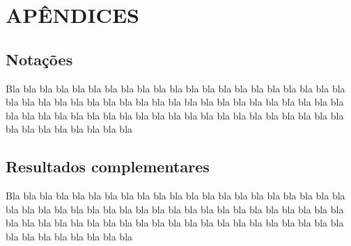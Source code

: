 \documentclass[
	article,			%
	12pt,				%
	oneside,			%
	a4paper,			%
	english,			%
	brazil,				%
	sumario=tradicional
	]{abntex2}
\begin{document}

\vspace{1cm}



\vspace{1cm}

\appendix
\chapter{APÊNDICES}

\section{Notações}
Bla bla bla bla bla bla bla bla bla bla bla bla bla bla bla bla bla bla bla bla bla bla bla bla bla bla bla bla bla bla bla bla bla bla bla bla bla bla bla bla bla bla bla bla bla bla bla bla bla bla bla bla bla bla bla bla bla bla bla bla bla bla bla bla bla bla bla bla bla bla bla

\section{Resultados complementares}
Bla bla bla bla bla bla bla bla bla bla bla bla bla bla bla bla bla bla bla bla bla bla bla bla bla bla bla bla bla bla bla bla bla bla bla bla bla bla bla bla bla bla bla bla bla bla bla bla bla bla bla bla bla bla bla bla bla bla bla bla bla bla bla bla bla bla bla bla bla bla bla
\end{document}
